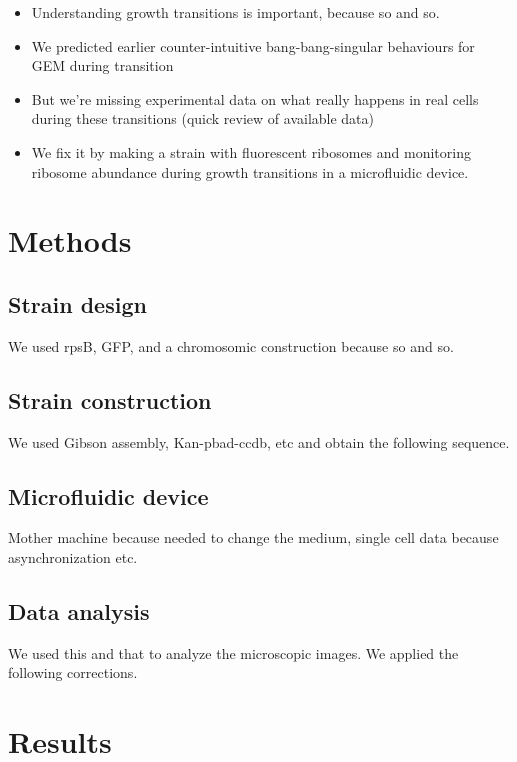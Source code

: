 \begin{itemize}
\item Understanding growth transitions is important, because so and so.
\item We predicted earlier counter-intuitive bang-bang-singular behaviours for GEM during transition
\item But we're missing experimental data on what really happens in real cells during these transitions (quick review of available data)
\item We fix it by making a strain with fluorescent ribosomes and monitoring ribosome abundance during growth transitions in a microfluidic device.
\end{itemize}

\section{Methods}

\subsection{Strain design}

We used rpsB, GFP, and a chromosomic construction because so and so.

\subsection{Strain construction}

We used Gibson assembly, Kan-pbad-ccdb, etc and obtain the following sequence.

\subsection{Microfluidic device}

Mother machine because needed to change the medium, single cell data because asynchronization etc.

\subsection{Data analysis}

We used this and that to analyze the microscopic images.
We applied the following corrections.

\section{Results}

